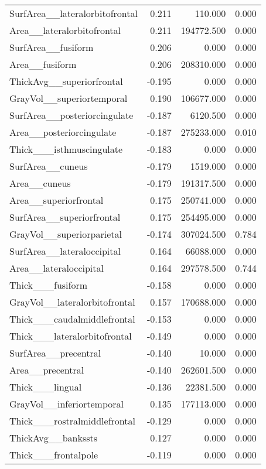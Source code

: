 \documentclass{article}
\begin{document}
\begin{table}
\begin{tabular}{lrrr}
	SurfArea\_\_lateralorbitofrontal & 0.211 & 110.000 & 0.000 \\
	Area\_\_lateralorbitofrontal & 0.211 & 194772.500 & 0.000 \\
	SurfArea\_\_fusiform & 0.206 & 0.000 & 0.000 \\
	Area\_\_fusiform & 0.206 & 208310.000 & 0.000 \\
	ThickAvg\_\_superiorfrontal & -0.195 & 0.000 & 0.000 \\
	GrayVol\_\_superiortemporal & 0.190 & 106677.000 & 0.000 \\
	SurfArea\_\_posteriorcingulate & -0.187 & 6120.500 & 0.000 \\
	Area\_\_posteriorcingulate & -0.187 & 275233.000 & 0.010 \\
	Thick\_\_\_isthmuscingulate & -0.183 & 0.000 & 0.000 \\
	SurfArea\_\_cuneus & -0.179 & 1519.000 & 0.000 \\
	Area\_\_cuneus & -0.179 & 191317.500 & 0.000 \\
	Area\_\_superiorfrontal & 0.175 & 250741.000 & 0.000 \\
	SurfArea\_\_superiorfrontal & 0.175 & 254495.000 & 0.000 \\
	GrayVol\_\_superiorparietal & -0.174 & 307024.500 & 0.784 \\
	SurfArea\_\_lateraloccipital & 0.164 & 66088.000 & 0.000 \\
	Area\_\_lateraloccipital & 0.164 & 297578.500 & 0.744 \\
	Thick\_\_\_fusiform & -0.158 & 0.000 & 0.000 \\
	GrayVol\_\_lateralorbitofrontal & 0.157 & 170688.000 & 0.000 \\
	Thick\_\_\_caudalmiddlefrontal & -0.153 & 0.000 & 0.000 \\
	Thick\_\_\_lateralorbitofrontal & -0.149 & 0.000 & 0.000 \\
	SurfArea\_\_precentral & -0.140 & 10.000 & 0.000 \\
	Area\_\_precentral & -0.140 & 262601.500 & 0.000 \\
	Thick\_\_\_lingual & -0.136 & 22381.500 & 0.000 \\
	GrayVol\_\_inferiortemporal & 0.135 & 177113.000 & 0.000 \\
	Thick\_\_\_rostralmiddlefrontal & -0.129 & 0.000 & 0.000 \\
	ThickAvg\_\_bankssts & 0.127 & 0.000 & 0.000 \\
	Thick\_\_\_frontalpole & -0.119 & 0.000 & 0.000 \\

\end{tabular}
\end{table}
\end{document}
